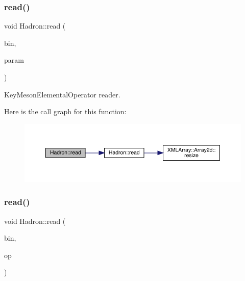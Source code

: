 \subsubsection{\texorpdfstring{read()}{read()}\hspace{0.1cm}{\footnotesize\ttfamily [42/94]}}
{\footnotesize\ttfamily void Hadron\+::read (\begin{DoxyParamCaption}\item[{\mbox{\hyperlink{classADATIO_1_1BinaryReader}{Binary\+Reader}} \&}]{bin,  }\item[{\mbox{\hyperlink{structHadron_1_1KeyMesonElementalOperator__t}{Key\+Meson\+Elemental\+Operator\+\_\+t}} \&}]{param }\end{DoxyParamCaption})}



Key\+Meson\+Elemental\+Operator reader. 

Here is the call graph for this function\+:
\nopagebreak
\begin{figure}[H]
\begin{center}
\leavevmode
\includegraphics[width=350pt]{d1/daf/namespaceHadron_ae6acb258c409e20fdd2a36b3266138bc_cgraph}
\end{center}
\end{figure}
\mbox{\label{namespaceHadron_a02133bc62e51d4baa57fb5ba0742ff43}} 
\subsubsection{\texorpdfstring{read()}{read()}\hspace{0.1cm}{\footnotesize\ttfamily [43/94]}}
{\footnotesize\ttfamily void Hadron\+::read (\begin{DoxyParamCaption}\item[{\mbox{\hyperlink{classADATIO_1_1BinaryReader}{Binary\+Reader}} \&}]{bin,  }\item[{\mbox{\hyperlink{structHadron_1_1KeySingleHadronQuarkSpin__t}{Key\+Single\+Hadron\+Quark\+Spin\+\_\+t}} \&}]{op }\end{DoxyParamCaption})}



